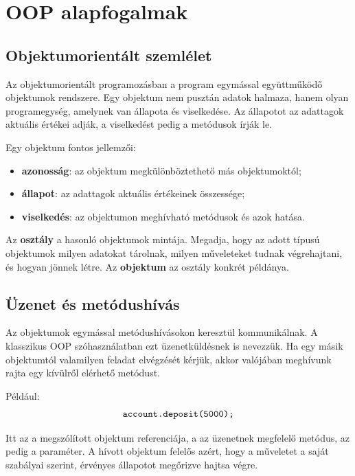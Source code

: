 \begin{center}

\end{center}

\section{OOP alapfogalmak}

\subsection{Objektumorientált szemlélet}

Az objektumorientált programozásban a program egymással együttműködő objektumok rendszere. Egy objektum nem pusztán adatok halmaza, hanem olyan programegység, amelynek van állapota és viselkedése. Az állapotot az adattagok aktuális értékei adják, a viselkedést pedig a metódusok írják le.

Egy objektum fontos jellemzői:

\begin{itemize}
  \item \textbf{azonosság}: az objektum megkülönböztethető más objektumoktól;
  \item \textbf{állapot}: az adattagok aktuális értékeinek összessége;
  \item \textbf{viselkedés}: az objektumon meghívható metódusok és azok hatása.
\end{itemize}

Az \textbf{osztály} a hasonló objektumok mintája. Megadja, hogy az adott típusú objektumok milyen adatokat tárolnak, milyen műveleteket tudnak végrehajtani, és hogyan jönnek létre. Az \textbf{objektum} az osztály konkrét példánya.

\subsection{Üzenet és metódushívás}

Az objektumok egymással metódushívásokon keresztül kommunikálnak. A klasszikus OOP szóhasználatban ezt üzenetküldésnek is nevezzük. Ha egy másik objektumtól valamilyen feladat elvégzését kérjük, akkor valójában meghívunk rajta egy kívülről elérhető metódust.

Például:
\[
  \texttt{account.deposit(5000);}
\]

Itt az  a megszólított objektum referenciája, a  az üzenetnek megfelelő metódus, az  pedig a paraméter. A hívott objektum felelős azért, hogy a műveletet a saját szabályai szerint, érvényes állapotot megőrizve hajtsa végre.

